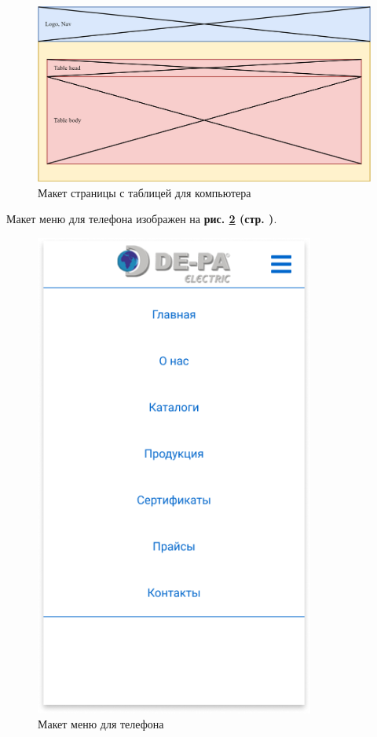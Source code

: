 \begin{figure}[!hp]
    \centering
    \includegraphics[width=12cm]
        {_assets/gpi_ui_get.png}
    \caption{Макет страницы с таблицей для компьютера}
    \label{fig:gpi_ui_get}
\end{figure}

Макет меню для телефона изображен на
\textbf{рис. \ref{fig:gpi_pz_phone_menu} (стр. \pageref{fig:gpi_pz_phone_menu})}.

\begin{figure}[!hp]
    \centering
    \includegraphics[height=16cm]
        {_assets/gpi_pz_android_menu.png}
    \caption{Макет меню для телефона}
    \label{fig:gpi_pz_phone_menu}
\end{figure}

